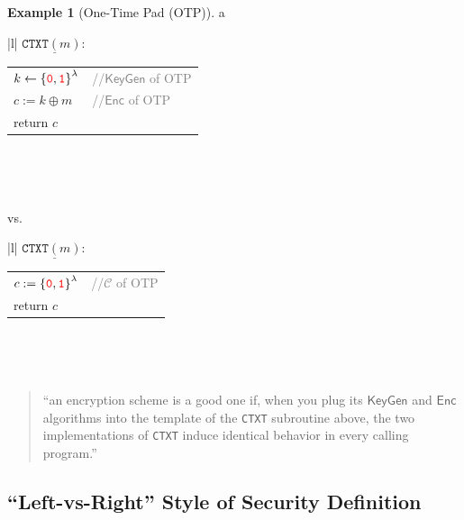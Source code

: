 \documentclass[12pt,openany]{book}
\theoremstyle{definition}
\newtheorem{example}{Example}[chapter]
\newcommand{\set}[1]{\left\{#1\right\}}
\newcommand{\KeyGen}{\mathsf{KeyGen}}
\newcommand{\Enc}{\mathsf{Enc}}
\newcommand{\ciphertextspace}{\mathcal{C}}
\newcommand{\zero}{\textcolor{red}{\texttt{0}}}
\newcommand{\one}{\textcolor{red}{\texttt{1}}}
\newcommand{\tab}{\hspace{8pt}}
\newcommand{\xor}{\oplus}
\newcommand{\binaryfield}{\set{\zero,\one}}
\begin{document}
	\begin{example}[One-Time Pad (OTP)]
		a\\ \begin{center}
			\begin{minipage}{.44\textwidth}
				\begin{tabular}{|l|}
					\hline
					$\underline{\texttt{CTXT}(m):}$\\
					\begin{tabular}{ll}
						\tab$k\gets\binaryfield^\lambda$ & \textcolor{gray}{//\(\KeyGen\) of OTP}\\
						\tab$c:=k\xor m$ & \textcolor{gray}{//\(\Enc\) of OTP}\\
						\tab return $c$\\
					\end{tabular}\\
					\hline
				\end{tabular}\\
			\end{minipage} vs.
		\begin{minipage}{.3\textwidth}
			\begin{tabular}{|l|}
				\hline
				$\underline{\texttt{CTXT}(m):}$\\
				\begin{tabular}{ll}
					\tab$c:=\binaryfield^\lambda$ & \textcolor{gray}{//\(\ciphertextspace\) of OTP}\\
					\tab return $c$\\
				\end{tabular}\\
				\hline
			\end{tabular}\\
		\end{minipage}
		\end{center}
	\end{example}

	\begin{quote}
		``an encryption scheme is a good one if, when you plug its \(\KeyGen\) and \(\Enc\) algorithms into the template of the \texttt{CTXT} subroutine above, the two implementations of \texttt{CTXT} induce identical behavior in every calling program.''
	\end{quote}

	\subsection{``Left-vs-Right'' Style of Security Definition}
	
\end{document}
